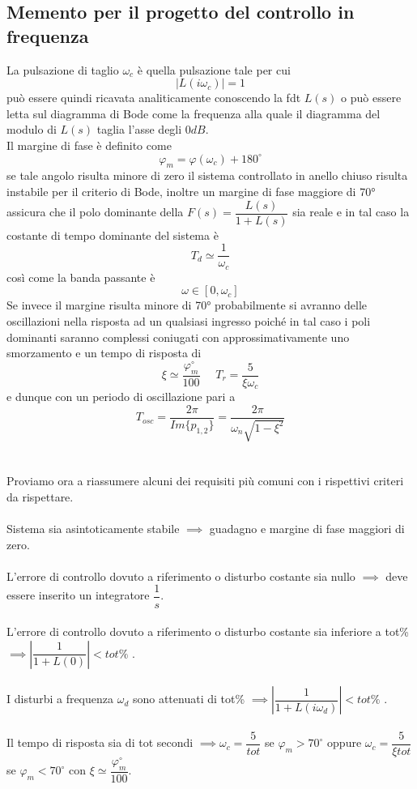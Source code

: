 \documentclass[a4paper]{article}
\begin{document}
	\subsection{Memento per il progetto del controllo in frequenza}
	La pulsazione di taglio $ \omega_c $ è quella pulsazione tale per cui \[|L(i\omega_c)|=1 \] 
	può essere quindi ricavata analiticamente conoscendo la fdt $ L(s) $ o può essere letta sul diagramma di Bode come la frequenza alla quale il diagramma del modulo di $ L(s) $ taglia l'asse degli $ 0dB $. 
	\\Il margine di fase è definito come \[ \varphi_m=\varphi(\omega_c)+180^{\circ} \] se tale angolo risulta minore di zero il sistema controllato in anello chiuso risulta instabile per il criterio di Bode, inoltre un margine di fase maggiore di 70° assicura che il polo dominante della $ F(s)=\dfrac{L(s)}{1+L(s)} $ sia reale e in tal caso la costante di tempo dominante del sistema è \[T_d\simeq\dfrac{1}{\omega_c}\] così come la banda passante è \[\omega\in[0,\omega_c]\] Se invece il margine risulta minore di 70° probabilmente si avranno delle oscillazioni nella risposta ad un qualsiasi ingresso poiché in tal caso i poli dominanti saranno complessi coniugati con approssimativamente uno smorzamento e un tempo di risposta di \[\xi\simeq\dfrac{\varphi_m^{\circ}}{100}\,\,\,\,\,\,\,\,T_r=\dfrac{5}{\xi\omega_c}\] e dunque con un periodo di oscillazione pari a \[T_{osc}=\dfrac{2\pi}{Im\{p_{1,2}\}}=\dfrac{2\pi}{\omega_n\sqrt{1-\xi^2}}\]
	\\\\Proviamo ora a riassumere alcuni dei requisiti più comuni con i rispettivi criteri da rispettare.
	\\\\Sistema sia asintoticamente stabile $ \implies $ guadagno e margine di fase maggiori di zero.
	\\\\L'errore di controllo dovuto a riferimento o disturbo costante sia nullo $ \implies $ deve essere inserito un integratore $\dfrac{1}{s}$.
	\\\\L'errore di controllo dovuto a riferimento o disturbo costante sia inferiore a tot\% $ \implies \left|\dfrac{1}{1+L(0)}\right|<tot\% $ .
	\\\\I disturbi a frequenza $\omega_d$ sono attenuati di tot\% $ \implies \left|\dfrac{1}{1+L(i\omega_d)}\right|<tot\% $ .
	\\\\Il tempo di risposta sia di tot secondi $ \implies \omega_c=\dfrac{5}{tot} $ se  $\varphi_m>70^{\circ}$ oppure $ \omega_c=\dfrac{5}{\xi tot} $ se $\varphi_m<70^{\circ}$ con $ \xi\simeq\dfrac{\varphi_{m}^{\circ}}{100}  $.
\end{document}
